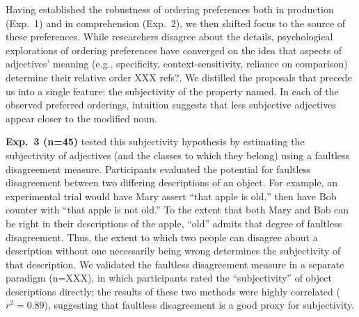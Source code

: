 \documentclass[12pt]{article}
\begin{document}
Having established the robustness of ordering preferences both in production (Exp.~1) and in comprehension (Exp.~2), we then shifted focus to the source of these preferences. While researchers disagree about the details, psychological explorations of ordering preferences have converged on the idea that aspects of  adjectives' meaning (e.g., specificity, context-sensitivity, reliance on comparison) determine their relative order XXX refs?. %
We distilled the proposals that precede us into a single feature: the subjectivity of the property named. In each of the observed preferred orderings, intuition suggests that less subjective adjectives appear closer to the modified noun. 

\textbf{Exp.~3 (n=45)} tested this subjectivity hypothesis  by estimating the subjectivity of adjectives (and the classes to which they belong) using a faultless disagreement measure. Participants evaluated the potential for faultless disagreement between two differing descriptions of an object. For example, an experimental trial would have Mary assert ``that apple is old,'' then have Bob counter with ``that apple is not old.'' 
To the extent that both Mary and Bob can be right in their descriptions of the apple, ``old'' admits that degree of faultless disagreement. 
Thus, the extent to which two people can disagree about a description without one necessarily being wrong determines the subjectivity of that description. 
We validated the faultless disagreement measure in a separate paradigm (n=XXX), in which participants rated the ``subjectivity'' of object descriptions directly; the results of these two methods were highly correlated ($r^{2} = 0.89$), suggesting that faultless disagreement is a good proxy for subjectivity.
\end{document}
